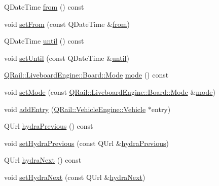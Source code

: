 \begin{DoxyCompactItemize}
Q\+Date\+Time \mbox{\hyperlink{classQRail_1_1LiveboardEngine_1_1Board_a503aaa8cea63f129e08581a49e308479}{from}} () const
\item 
void \mbox{\hyperlink{classQRail_1_1LiveboardEngine_1_1Board_af463ed571976fe8a7c49a365b7cc2ebe}{set\+From}} (const Q\+Date\+Time \&\mbox{\hyperlink{classQRail_1_1LiveboardEngine_1_1Board_a503aaa8cea63f129e08581a49e308479}{from}})
\item 
Q\+Date\+Time \mbox{\hyperlink{classQRail_1_1LiveboardEngine_1_1Board_af09d8cddaaf92ba4a3a5d74ee393388b}{until}} () const
\item 
void \mbox{\hyperlink{classQRail_1_1LiveboardEngine_1_1Board_a1739cf48ec910b5ee0394d30c7ade72b}{set\+Until}} (const Q\+Date\+Time \&\mbox{\hyperlink{classQRail_1_1LiveboardEngine_1_1Board_af09d8cddaaf92ba4a3a5d74ee393388b}{until}})
\item 
\mbox{\hyperlink{classQRail_1_1LiveboardEngine_1_1Board_a0ab6d318f405895f62c6e98cb2d86c6e}{Q\+Rail\+::\+Liveboard\+Engine\+::\+Board\+::\+Mode}} \mbox{\hyperlink{classQRail_1_1LiveboardEngine_1_1Board_a72d581701ab9d478f7e1943d0d3effb4}{mode}} () const
\item 
void \mbox{\hyperlink{classQRail_1_1LiveboardEngine_1_1Board_a64e85afaca570209ba08a350460315d2}{set\+Mode}} (const \mbox{\hyperlink{classQRail_1_1LiveboardEngine_1_1Board_a0ab6d318f405895f62c6e98cb2d86c6e}{Q\+Rail\+::\+Liveboard\+Engine\+::\+Board\+::\+Mode}} \&\mbox{\hyperlink{classQRail_1_1LiveboardEngine_1_1Board_a72d581701ab9d478f7e1943d0d3effb4}{mode}})
\item 
void \mbox{\hyperlink{classQRail_1_1LiveboardEngine_1_1Board_ad79d5e4cd527fe02165f1231478b8f8b}{add\+Entry}} (\mbox{\hyperlink{classQRail_1_1VehicleEngine_1_1Vehicle}{Q\+Rail\+::\+Vehicle\+Engine\+::\+Vehicle}} $\ast$entry)
\item 
Q\+Url \mbox{\hyperlink{classQRail_1_1LiveboardEngine_1_1Board_a7a89e2b711234a6a0969bee75d4a567e}{hydra\+Previous}} () const
\item 
void \mbox{\hyperlink{classQRail_1_1LiveboardEngine_1_1Board_af8c481758c476c1e3bf471e87ba31613}{set\+Hydra\+Previous}} (const Q\+Url \&\mbox{\hyperlink{classQRail_1_1LiveboardEngine_1_1Board_a7a89e2b711234a6a0969bee75d4a567e}{hydra\+Previous}})
\item 
Q\+Url \mbox{\hyperlink{classQRail_1_1LiveboardEngine_1_1Board_a0ed5cfc1cc0b6584bf087f936f60dcab}{hydra\+Next}} () const
\item 
void \mbox{\hyperlink{classQRail_1_1LiveboardEngine_1_1Board_a01f417e63bf4071ffec42bab89c4a433}{set\+Hydra\+Next}} (const Q\+Url \&\mbox{\hyperlink{classQRail_1_1LiveboardEngine_1_1Board_a0ed5cfc1cc0b6584bf087f936f60dcab}{hydra\+Next}})
\end{DoxyCompactItemize}


